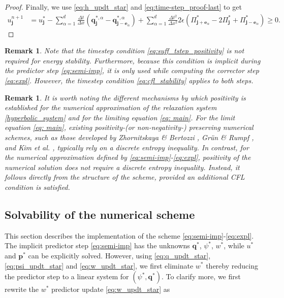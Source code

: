 \documentclass[11pt]{article}
\numberwithin{equation}{section}
\newtheorem{counter example}[theorem]{Counter Example}
\newtheorem{remark}[theorem] {Remark}
\numberwithin{equation}{section}
\numberwithin{equation}{section}
\begin{document}
\begin{proof}
Finally, we use \eqref{eq:h_updt_star} and \eqref{eq:time-step_proof-last} to get
\begin{align}
u_{\mathbf{j}}^{n+1}&=
u^*_{\mathbf j}-\sum_{\alpha=1}^d\frac{\Delta t}{\Delta x}
\left( \mathbf{q}_{\mathbf{j}}^{*,\alpha} - \mathbf{q}_{\mathbf{j}-\mathbf{e}_\alpha}^{*,\alpha} \right)
+
\sum_{\alpha=1}^d\frac{\Delta t^2}{\Delta x^2}2\epsilon \left(
\Pi_{\mathbf{j}+\mathbf{e}_\alpha}^*
-2\Pi_{\mathbf{j}}^*
+\Pi_{\mathbf{j}-\mathbf{e}_\alpha}^*
\right)\geq 0. 
\end{align}
\end{proof}
\begin{remark}
    Note that the timestep condition \eqref{eq:suff_tstep_positivity} is not required for energy stability. Furthermore, because this condition is implicit during the predictor step \eqref{eq:semi-imp}, it is only used while computing the corrector step \eqref{eq:expl}. However, the timestep condition \eqref{eq:cfl_stability} applies to both steps.
\end{remark}
\begin{remark}
It is worth noting the different mechanisms by which positivity is established for the numerical approximation of the relaxation system \eqref{hyperbolic_system} and for the limiting equation \eqref{eq: main}. For the limit equation \eqref{eq: main}, existing positivity-(or non-negativity-) preserving numerical schemes, such as those developed by Zhornitskaya \& Bertozzi \cite{zhornitskaya1999positivity}, Gr\"un \& Rumpf \cite{grun2000nonnegativity}, and Kim et al. \cite{kim2024positivity}, typically rely on a discrete entropy inequality. In contrast, for the numerical approximation defined by \eqref{eq:semi-imp}-\eqref{eq:expl}, positivity of the numerical solution does not require a discrete entropy inequality. Instead, it follows directly from the structure of the scheme, provided an additional CFL condition is satisfied.
\end{remark}


\subsection{Solvability of the numerical scheme}
\label{sec:solvability}
This section describes the implementation of the scheme \eqref{eq:semi-imp}-\eqref{eq:expl}. The implicit predictor step \eqref{eq:semi-imp} has the unknowns $\mathbf{q}^*$, $\psi^*$, $w^*$, while $u^*$ and $\mathbf{p}^*$ can be explicitly solved. However, using \eqref{eq:q_updt_star}, \eqref{eq:psi_updt_star} and \eqref{eq:w_updt_star}, we first eliminate $w^*$ thereby reducing the predictor step to a linear system for $(\psi^*,\mathbf{q}^*)$. To clarify more, we first rewrite the $w^*$ predictor update \eqref{eq:w_updt_star} as
\end{document}
